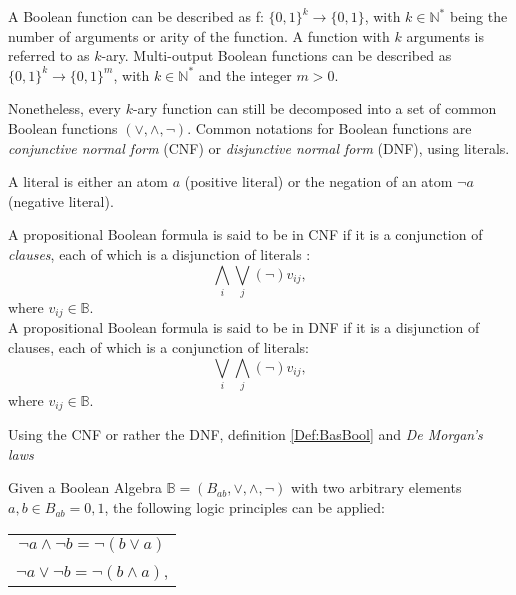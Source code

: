 \begin{definition}
	A Boolean function can be described as f: $\{0, 1\}^k \to \{0, 1\}$, with $k \in \mathbb{N}^*$ being the number of arguments or arity of the function. A function with $k$ arguments is referred to as $k$-ary. Multi-output Boolean functions can be described as $\{0, 1\}^k \to \{0, 1\}^m$, with $k \in \mathbb{N}^*$ and the integer $m > 0$.
\end{definition}

Nonetheless, every $k$-ary function can still be decomposed into a set of common Boolean functions $(\vee, \wedge, \neg )$.
Common notations for Boolean functions are \textit{conjunctive normal form} (CNF) or \textit{disjunctive normal form} (DNF), using literals.

\begin{definition}
	A literal is either an atom $a$ (positive literal) or the negation of an atom $\neg a$ (negative literal).
\end{definition}

\begin{definition}
	A propositional Boolean formula is said to be in CNF if it is a conjunction of \textit{clauses}, each of which is a disjunction of literals \cite{CNF}:\\
	\[\displaystyle\bigwedge_{i} \displaystyle\bigvee_{j} (\neg) v_{ij}, \]
	where $v_{ij} \in \mathbb{B}$.\\
	A propositional Boolean formula is said to be in DNF if it is a disjunction of clauses, each of which is a conjunction of literals:\\
	\[ \displaystyle\bigvee_{i} \displaystyle\bigwedge_{j} (\neg) v_{ij}, \]
	where $v_{ij} \in \mathbb{B}$.
	
\end{definition}

Using the CNF or rather the DNF, definition \ref{Def:BasBool} and \textit{De Morgan's laws} \cite{DeMorgans_laws}

\begin{definition}
	Given a Boolean Algebra $\mathbb{B} = (B_{ab}, \vee, \wedge, \neg)$ with two arbitrary elements $a,b \in B_{ab} = {0, 1}$, the following logic principles can be applied:
	\begin{table}[h]
		\centering
		\begin{tabular}{c}
			$\neg a \wedge \neg b = \neg (b \vee a)$ \\
			$\neg a \vee \neg b = \neg (b \wedge a)$,
		\end{tabular}
	\end{table}
\end{definition}

